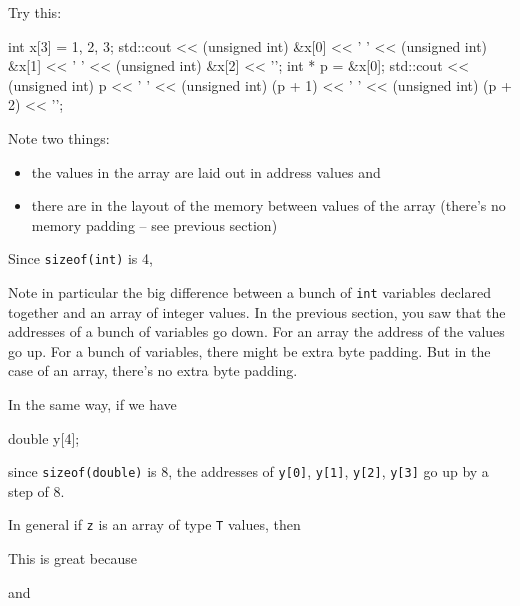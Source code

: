\newpage{}

Try this:

\begin{consolethree}[escapeinside=||]
int x[3] = {1, 2, 3};
std::cout << (unsigned int) &x[0] << ' '
          << (unsigned int) &x[1] << ' '
          << (unsigned int) &x[2] << '\n';
int * p = &x[0];
std::cout << (unsigned int) p << ' '
          << (unsigned int) (p + 1) << ' '
          << (unsigned int) (p + 2) << '\n';
\end{consolethree}

Note two things:

\begin{itemize}
\item the values in the array are laid out in  address
  values and
\item there are  in the layout of the memory between values
  of the array (there's no memory padding -- see previous section)
\end{itemize}

Since \texttt{sizeof(int)} is 4,
\begin{center}
\texttt{} \texttt{}
\end{center}

Note in particular the big difference between a bunch of \texttt{int} variables declared together and an array of integer values. In the previous section, you saw that the addresses of a bunch of variables go down. For an array the address of the values go up. For a bunch of variables, there might be extra byte padding. But in the case of an array, there's no extra byte padding.

In the same way, if we have

\begin{consolethree}[escapeinside=||]
double y[4];
\end{consolethree}

since \texttt{sizeof(double)} is 8, the addresses of \texttt{y[0]}, \texttt{y[1]}, \texttt{y[2]}, \texttt{y[3]} go up by a step of 8.

In general if \texttt{z} is an array of type \texttt{T} values, then
\begin{center}
\end{center}
This is great because
\begin{center}
\end{center}
and
\begin{center}
\end{center}

